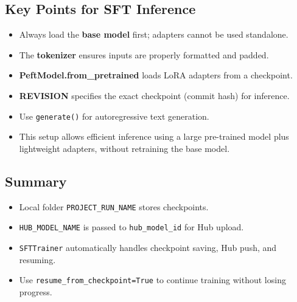 \documentclass[a4paper, 12pt]{article}
\begin{document}
\subsection*{Key Points for SFT Inference}
\begin{tcolorbox}[colback=blue!5!white, colframe=blue!80!black, title=\textbf{Important Notes}, 
                  coltitle=black, fonttitle=\bfseries, enhanced, sharp corners, boxrule=1pt]
\begin{itemize}
    \item Always load the \textbf{base model} first; adapters cannot be used standalone.
    \item The \textbf{tokenizer} ensures inputs are properly formatted and padded.
    \item \textbf{PeftModel.from\_pretrained} loads LoRA adapters from a checkpoint.
    \item \textbf{REVISION} specifies the exact checkpoint (commit hash) for inference.
    \item Use \texttt{generate()} for autoregressive text generation.
    \item This setup allows efficient inference using a large pre-trained model 
    plus lightweight adapters, without retraining the base model.
\end{itemize}
\end{tcolorbox}



\subsection*{Summary}
\begin{tcolorbox}[colback=blue!5!white, colframe=blue!75!black, title=Key Points]
\begin{itemize}
    \item Local folder \texttt{PROJECT\_RUN\_NAME} stores checkpoints.
    \item \texttt{HUB\_MODEL\_NAME} is passed to \texttt{hub\_model\_id} for Hub upload.
    \item \texttt{SFTTrainer} automatically handles checkpoint saving, Hub push, and resuming.
    \item Use \texttt{resume\_from\_checkpoint=True} to continue training without losing progress.
\end{itemize}
\end{tcolorbox}



\newpage
\end{document}
